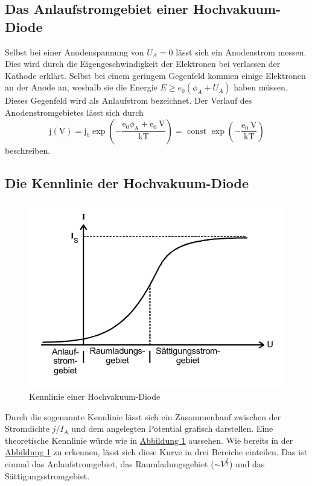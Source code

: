 \subsection{Das Anlaufstromgebiet einer Hochvakuum-Diode}

Selbst bei einer Anodenspannung von $U_A = 0$ lässt sich ein Anodenstrom messen.
Dies wird durch die Eigengeschwindigkeit der Elektronen bei verlassen der Kathode erklärt.
Selbst bei einem geringem Gegenfeld kommen einige Elektronen an der Anode an, weshalb sie die Energie $E \geq e_0 (\phi_A + U_A)$ haben müssen.
Dieses Gegenfeld wird als Anlaufstrom bezeichnet.
Der Verlauf des Anodenstromgebietes lässt sich durch
\begin{equation}\label{eq:anlaufstromgebiet}
    \mathrm{j}(\mathrm{V})=\mathrm{j}_{0} \exp \left(-\frac{\mathrm{e}_{0} \phi_{\mathrm{A}}+\mathrm{e}_{0} \mathrm{~V}}{\mathrm{kT}}\right)=\text { const } \exp \left(-\frac{\mathrm{e}_{0} \mathrm{~V}}{\mathrm{kT}}\right)
\end{equation}
beschreiben.


\subsection{Die Kennlinie der Hochvakuum-Diode}

\begin{figure}
    \center
    \caption{Kennlinie einer Hochvakuum-Diode}\label{fig:KennlinieTheorie}
    \includegraphics[width=0.8\linewidth]{pictures/KennlinieTheorie.pdf}
\end{figure}
Durch die sogenannte Kennlinie lässt sich ein Zusammenhanf zwischen der Stromdichte $j / I_A$ und dem angelegten Potential
grafisch darstellen.
Eine theoretische Kennlinie würde wie in \hyperref[fig:KennlinieTheorie]{Abbildung \ref{fig:KennlinieTheorie}} aussehen.
Wie bereits in der \hyperref[fig:KennlinieTheorie]{Abbildung \ref{fig:KennlinieTheorie}} zu erkennen, lässt sich diese Kurve in drei Bereiche einteilen.
Das ist einmal das Anlaufstromgebiet, das Raumladungsgebiet ($\sim V^{\frac{3}{2}}$) und das Sättigungsstromgebiet.